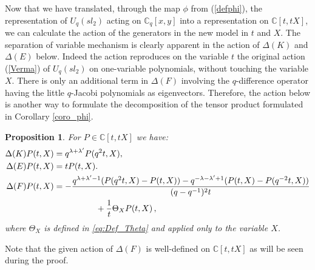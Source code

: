 \documentclass[a4paper,12pt]{article}
\numberwithin{equation}{section}
\newcommand{\C}{\mathbb{C}}
\newtheorem{prop}[theo]{Proposition}
\theoremstyle{rem}
\theoremstyle{definition}
\begin{document}
Now that we have translated, through the map $\phi$ from (\ref{defphi}), the representation of $U_q(sl_2)$ acting on $\C_q[x,y]$ into a representation on $\C[t,tX]$, we can calculate the action of the generators in the new model in $t$ and $X$. The separation of variable mechanism is clearly apparent in the action of $\Delta(K)$ and $\Delta(E)$ below. Indeed the action reproduces on the variable $t$ the original action (\ref{Verma}) of $U_q(sl_2)$ on one-variable polynomials, without touching the variable $X$. There is only an additional term in $\Delta(F)$ involving the $q$-difference operator having the little $q$-Jacobi polynomials as eigenvectors. Therefore, the action below is another way to formulate the decomposition of the tensor product formulated in Corollary \ref{coro_phi}.
\begin{prop}\label{prop_actiontX}
For $P\in \C[t,tX]$ we have:
\begin{align}
\Delta(K)P(t,X)&=q^{\lambda+\lambda'}P(q^2t,X),\\
\Delta(E)P(t,X)&=tP(t,X).\\
\Delta(F)P(t,X)&=-\frac{q^{\lambda+\lambda'-1}(P(q^2t,X)-P(t,X))-q^{-\lambda-\lambda'+1}(P(t,X)-P(q^{-2}t,X))}{(q-q^{-1})^2t} \notag\\
 & \ \ \ \qquad\qquad +\frac{1}{t}\Theta_X P(t,X)\,, \label{eq:DeltaF_en_t,X}
\end{align} 
where $\Theta_X$ is defined in \eqref{eq:Def_Theta} and applied only to the variable $X$. 
\end{prop}
\noindent Note that the given action of $\Delta(F)$ is well-defined on $\C[t,tX]$ as will be seen during the proof.
\end{document}
